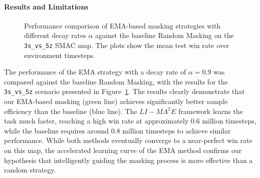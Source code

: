 \paragraph{Results and Limitations}
\begin{figure}[h]
\centering
{}%
\hfill%
%
\caption{Performance comparison of EMA-based masking strategies with different decay rates $\alpha$ against the baseline Random Masking on the \texttt{3s\_vs\_5z} SMAC map. The plots show the mean test win rate over environment timesteps.}
\label{fig:ema_comparison}
\end{figure}
The performance of the EMA strategy with a decay rate of $\alpha=0.9$ was compared against the baseline Random Masking, with the results for the \texttt{3s\_vs\_5z} scenario presented in Figure~\ref{fig:ema_comparison}.
The results clearly demonstrate that our EMA-based masking (green line) achieves significantly better sample efficiency than the baseline (blue line). The $LI-{MA}^2E$ framework learns the task much faster, reaching a high win rate at approximately 0.6 million timesteps, while the baseline requires around 0.8 million timesteps to achieve similar performance. While both methods eventually converge to a near-perfect win rate on this map, the accelerated learning curve of the EMA method confirms our hypothesis that intelligently guiding the masking process is more effective than a random strategy.

